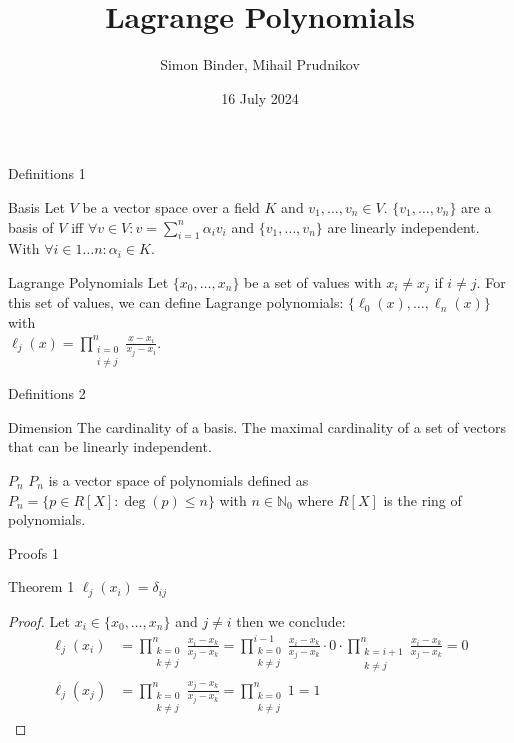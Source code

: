 \documentclass[8pt]{beamer}
\title{Lagrange Polynomials}
\date{16 July 2024}
\author{Simon Binder, Mihail Prudnikov}
\begin{document}
	\begin{frame}[plain]
		\maketitle
	\end{frame}
	
	\begin{frame}{Definitions 1}
		\begin{block}{Basis}
			Let $V$ be a vector space over a field $K$ and $v_1, \ldots, v_n \in V$. $\{ v_1, \ldots, v_n\} $ are a basis of $V$ iff $\forall v \in V: v = \sum_{i=1}^{n}\alpha_i v_i$ and $\{ v_1, \ldots, v_n\}$ are linearly independent. With $\forall i \in 1 \ldots n: \alpha_i \in K$. \cite{basis}
		\end{block}
		\begin{block}{Lagrange Polynomials}
			Let $\{x_0, \ldots, x_n \}$ be a set of values with $x_i \neq x_j$ if $i \neq j$. For this set of values, we can define Lagrange polynomials: $\{\ell_0(x), \ldots, \ell_n(x)\}$ with \\ $\ell_j(x) = 
			\displaystyle \prod_{\substack{i= 0 \\ i \neq j }}^{n}\frac{x - x_i}{x_j - x_i}$. \cite{lagrange}
		\end{block}
	\end{frame}
	
	\begin{frame}{Definitions 2}
		\begin{block}{Dimension}
			The cardinality of a basis. The maximal cardinality of a set of vectors that can be linearly independent. \cite{basis}
		\end{block}
		\begin{block}{$P_n$}
			$P_n$ is a vector space of polynomials defined as $P_n = \{p \in R[X] : \deg(p) \leq n \}$ with $n \in \mathbb{N}_0$ where $R[X]$ is the ring of polynomials.\cite{lagrange}
		\end{block}
	\end{frame}
	
	\begin{frame}{Proofs 1}
		\begin{block}{Theorem 1}
			$\ell_j(x_i) = \delta_{ij}$
		\end{block}
		\begin{proof}
			Let $x_i \in \{x_0, \ldots, x_n \}$ and $j \neq i$ then we conclude: 
			\begin{align*}
				\ell_j(x_i) &= \prod_{\substack{k= 0 \\ k \neq j }}^{n}\frac{x_i - x_k}{x_j - x_k} = \prod_{\substack{k= 0 \\ k \neq j}}^{i-1}\frac{x_i - x_k}{x_j - x_k} \cdot 0 \cdot \prod_{\substack{k= i+1 \\ k \neq j}}^{n}\frac{x_i - x_k}{x_j - x_k} = 0 \\
				\ell_j(x_j) &= \prod_{\substack{k= 0 \\ k \neq j }}^{n}\frac{x_j - x_k}{x_j - x_k} =  \prod_{\substack{k= 0 \\ k \neq j }}^{n} 1 = 1
			\end{align*}
		\end{proof}
	\end{frame}
			
\end{document}
